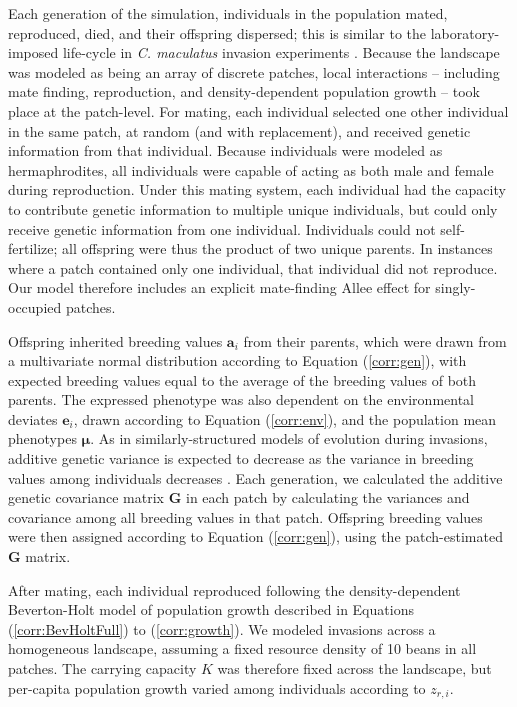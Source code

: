 
Each generation of the simulation, individuals in the population mated, reproduced, died, and their offspring dispersed; this is similar to the laboratory-imposed life-cycle in \textit{C. maculatus} invasion experiments \citep{miller_sex_2013,wagner_genetic_2016,ochocki_rapid_2017}. Because the landscape was modeled as being an array of discrete patches, local interactions -- including mate finding, reproduction, and density-dependent population growth -- took place at the patch-level.
For mating, each individual selected one other individual in the same patch, at random (and with replacement), and received genetic information from that individual. Because individuals were modeled as hermaphrodites, all individuals were capable of acting as both male and female during reproduction. Under this mating system, each individual had the capacity to contribute genetic information to multiple unique individuals, but could only receive genetic information from one individual. Individuals could not self-fertilize; all offspring were thus the product of two unique parents. In instances where a patch contained only one individual, that individual did not reproduce. Our model therefore includes an explicit \tom{[implicit?]} mate-finding Allee effect for singly-occupied patches.

Offspring inherited breeding values $\bm{a}_{i}$ from their parents, which were drawn from a multivariate normal distribution according to Equation (\ref{corr:gen}), with expected breeding values equal to the average of the breeding values of both parents. The expressed phenotype was also dependent on the environmental deviates $\bm{e}_{i}$, drawn according to Equation (\ref{corr:env}), and the population mean phenotypes $\bm{\mu}$. As in similarly-structured models of evolution during invasions, additive genetic variance is expected to decrease as the variance in breeding values among individuals decreases \citep{phillips_evolutionary_2015}. Each generation, we calculated the additive genetic covariance matrix $\bm{G}$ in each patch by calculating the variances and covariance among all breeding values in that patch. Offspring breeding values were then assigned according to Equation (\ref{corr:gen}), using the patch-estimated $\bm{G}$ matrix.

After mating, each individual reproduced following the density-dependent Beverton-Holt model of population growth described in Equations (\ref{corr:BevHoltFull}) to (\ref{corr:growth}). We modeled invasions across a homogeneous landscape, assuming a fixed resource density of 10 beans in all patches. The carrying capacity $K$ was therefore fixed across the landscape, but per-capita population growth varied among individuals according to $z_{r,i}$.

